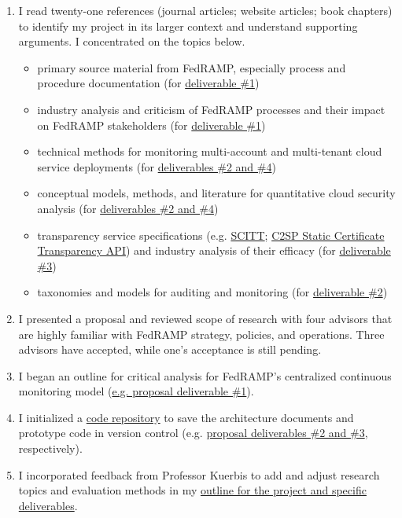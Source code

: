 \documentclass{jdf}
\begin{document}
\begin{enumerate}
    \item I read twenty-one references (journal articles; website articles; book chapters) to identify my project in its larger context and understand supporting arguments. I concentrated on the topics below.
        \begin{itemize}
            \item primary source material from FedRAMP, especially process and procedure documentation (for  \hyperlink{https://github.com/aj-stein/practicum_proposal/blob/main/paper.pdf}{deliverable \#1})
            \item industry analysis and criticism of FedRAMP processes and their impact on FedRAMP stakeholders (for  \hyperlink{https://github.com/aj-stein/practicum_proposal/blob/main/paper.pdf}{deliverable \#1})
            \item technical methods for monitoring multi-account and multi-tenant cloud service deployments (for  \hyperlink{https://github.com/aj-stein/practicum_proposal/blob/main/paper.pdf}{deliverables \#2 and \#4})
            \item conceptual models, methods, and literature for quantitative cloud security analysis (for  \hyperlink{https://github.com/aj-stein/practicum_proposal/blob/main/paper.pdf}{deliverables \#2 and \#4})
            \item transparency service specifications (e.g. \hyperlink{https://datatracker.ietf.org/doc/draft-ietf-scitt-architecture/}{SCITT}; \hyperlink{https://c2sp.org/static-ct-api}{C2SP Static Certificate Transparency API}) and industry analysis of their efficacy (for  \hyperlink{https://github.com/aj-stein/practicum_proposal/blob/main/paper.pdf}{deliverable \#3})
            \item taxonomies and models for auditing and monitoring (for  \hyperlink{https://github.com/aj-stein/practicum_proposal/blob/main/paper.pdf}{deliverable \#2})
        \end{itemize}
    \item I presented a proposal and reviewed scope of research with four advisors that are highly familiar with FedRAMP strategy, policies, and operations. Three advisors have accepted, while one's acceptance is still pending.
    \item I began an outline for critical analysis for FedRAMP's centralized continuous monitoring model (\hyperlink{https://github.com/aj-stein/practicum_proposal/blob/main/paper.pdf}{e.g. proposal deliverable \#1}).
    \item I initialized a \hyperlink{https://github.com/aj-stein/conmotion.git}{code repository} to save the architecture documents and prototype code in version control (e.g. \hyperlink{https://github.com/aj-stein/practicum_proposal/blob/main/paper.pdf}{proposal deliverables \#2 and \#3}, respectively).
    \item I incorporated feedback from Professor Kuerbis to add and adjust research topics and evaluation methods in my \hyperlink{https://github.com/aj-stein/practicum/blob/main/notes.pdf}{outline for the project and specific deliverables}.
\end{enumerate}
\end{document}
